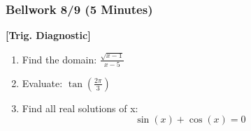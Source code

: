 \documentclass[12pt]{beamer}
\begin{document}
	\begin{frame}[t]
		\frametitle{Bellwork 8/9 (5 Minutes)}
		\initclock
		\textbf{[Trig. Diagnostic]}\vspace{.2cm}\\
		\begin{enumerate}
			\item Find the domain: $\frac{\sqrt{x-1}}{x-5}$
			\item Evaluate: $\tan\left(\frac{2\pi}{3}\right)$
			\item Find all real solutions of x: \[\sin(x)+\cos(x)=0\]
		\end{enumerate}
		\crono
	\end{frame}
\end{document}
